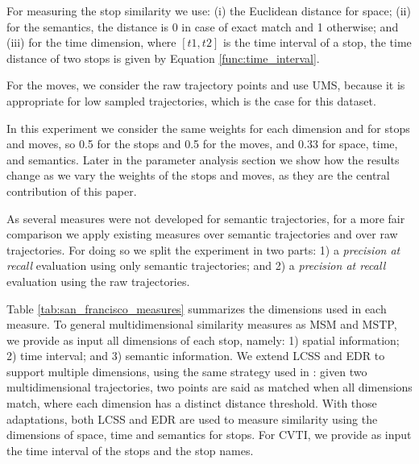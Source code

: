 \documentclass[12pt]{article}
\begin{document}
For measuring the stop similarity we use: (i) the Euclidean distance for space; (ii){ for the semantics, the distance is 0 in case of exact match and 1 otherwise; and (iii) for the time dimension, where $[t1, t2]$ is the time interval of a stop, the time distance of two stops is given by  Equation} \ref{func:time_interval}.




For the moves, we consider the raw trajectory points and use UMS, because it is appropriate for low sampled trajectories, which is the case for this dataset. %

{In this experiment we consider the same weights for each dimension and for stops and moves, so 0.5 for the stops and 0.5 for the moves, and 0.33 for space, time, and semantics. Later in the parameter analysis section we show how the results change as we vary the weights of the stops and moves, as they are the central contribution of this paper.}

As several measures were not developed for semantic trajectories, for a more fair comparison we apply existing measures over semantic trajectories and over raw trajectories. For doing so we split the experiment in two parts: 1) a \textit{precision at recall} evaluation using only semantic trajectories; and 2) a \textit{precision at recall} evaluation using the raw trajectories.%

Table {\ref{tab:san_francisco_measures}} summarizes the dimensions used in each measure. To general multidimensional similarity measures as MSM and MSTP, we provide as input all dimensions of each stop, namely: 1)  spatial information; 2) time interval; and 3) semantic information. We extend LCSS and EDR to support multiple dimensions, using the same strategy used in {\cite{Furtado:TGIS12156}}: given two multidimensional trajectories, two points are said as matched when all dimensions match, where each dimension has a distinct distance threshold. With those adaptations, both LCSS and EDR are used to measure similarity using the dimensions of space, time and semantics for stops. For CVTI, we provide as input the time interval of the stops and the stop names.
\end{document}
